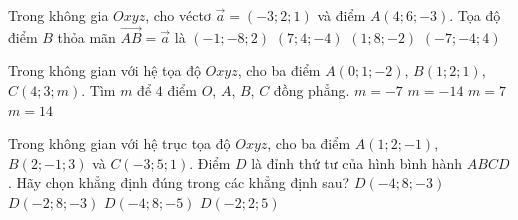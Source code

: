 \begin{ex}%
	Trong không gia $Oxyz$, cho véctơ $\overrightarrow{a}=(-3;2;1)$ và điểm $A(4;6;-3)$. Tọa độ điểm  $B$ thỏa mãn $\overrightarrow{AB}=\overrightarrow{a}$ là
	 \choice
		 {$(-1;-8;2)$}
		{$(7;4;-4)$} 
		{\True $(1;8;-2)$} 
		{$(-7;-4;4)$} 
\end{ex}

\begin{ex}%
	 Trong không gian với hệ tọa độ $Oxyz$, cho ba điểm $A(0;1;-2)$, $B(1;2;1)$, $C(4;3;m)$. Tìm $m$ để $4$ điểm $O$, $A$, $B$, $C$ đồng phẳng.
	 \choice
		 {$m=-7$}
		 {$m=-14$}
		{$m=7$} 
		 {\True $m=14$}
\end{ex}

\begin{ex}%
	Trong không gian với hệ trục tọa độ $Oxyz$, cho ba điểm  $A(1;2;-1)$, $B(2;-1;3)$ và $C(-3;5;1)$. Điểm $D$ là đỉnh thứ tư của hình bình hành $ABCD$. Hãy chọn khẳng định đúng trong các khẳng định sau?
	\choice 
		{\True $D(-4;8;-3)$} 
		 {$D(-2;8;-3)$}
		 {$D(-4;8;-5)$}
		{$D(-2;2;5)$} 
\end{ex}


